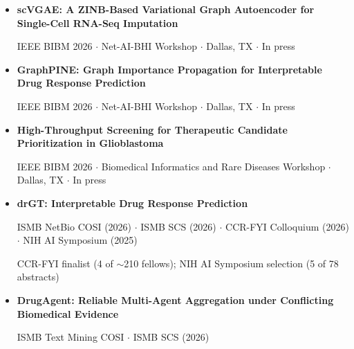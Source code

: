 \documentclass[11pt]{article}
\begin{document}
\begin{itemize}[leftmargin=*,itemsep=6pt,topsep=3pt]
    \item[] \textbf{scVGAE: A ZINB-Based Variational Graph Autoencoder for Single-Cell RNA-Seq Imputation}\par\nobreak
    {\small\color{CvMuted}IEEE BIBM 2026 $\cdot$ Net-AI-BHI Workshop $\cdot$ Dallas, TX $\cdot$ In press}

    \item[] \textbf{GraphPINE: Graph Importance Propagation for Interpretable Drug Response Prediction}\par\nobreak
    {\small\color{CvMuted}IEEE BIBM 2026 $\cdot$ Net-AI-BHI Workshop $\cdot$ Dallas, TX $\cdot$ In press}

    \item[] \textbf{High-Throughput Screening for Therapeutic Candidate Prioritization in Glioblastoma}\par\nobreak
    {\small\color{CvMuted}IEEE BIBM 2026 $\cdot$ Biomedical Informatics and Rare Diseases Workshop $\cdot$ Dallas, TX $\cdot$ In press}

    \item[] \textbf{drGT: Interpretable Drug Response Prediction}\par\nobreak
    {\small\color{CvMuted}ISMB NetBio COSI (2026) $\cdot$ ISMB SCS (2026) $\cdot$ CCR-FYI Colloquium (2026) $\cdot$ NIH AI Symposium (2025)}\par\nobreak
    {\small\color{CvMuted}CCR-FYI finalist (4 of $\sim$210 fellows); NIH AI Symposium selection (5 of 78 abstracts)}

    \item[] \textbf{DrugAgent: Reliable Multi-Agent Aggregation under Conflicting Biomedical Evidence}\par\nobreak
    {\small\color{CvMuted}ISMB Text Mining COSI $\cdot$ ISMB SCS (2026)}
\end{itemize}
\end{document}

